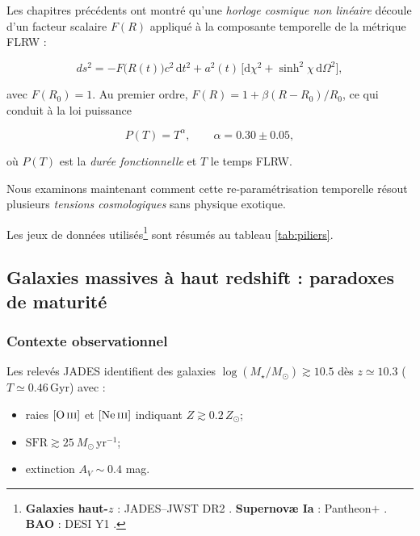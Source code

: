 \documentclass[11pt]{article}
\begin{document}
Les chapitres précédents ont montré qu’une \emph{horloge cosmique non
linéaire} découle d’un facteur scalaire \(F(R)\) appliqué à
la composante temporelle de la métrique FLRW :

\begin{equation}
\label{eq:metricRenorm}
ds^{2} = -F\!\bigl(R(t)\bigr)c^{2}\,\mathrm dt^{2}
         + a^{2}(t)\,\bigl[\mathrm d\chi^{2}
         +\sinh^{2}\!\chi\,\mathrm d\Omega^{2}\bigr],
\end{equation}

avec \(F(R_{0})=1\).  Au premier ordre,
\(F(R)=1+\beta(R-R_{0})/R_{0}\), ce qui conduit à la loi puissance

\begin{equation}
\label{eq:PTpower}
P(T)=T^{\alpha},
\qquad
\alpha = 0.30 \pm 0.05,
\end{equation}

où \(P(T)\) est la \emph{durée fonctionnelle} et \(T\) le temps FLRW.

Nous examinons maintenant comment cette re-paramétrisation temporelle
résout plusieurs \emph{tensions cosmologiques} sans physique exotique.

Les jeux de données utilisés\footnote{%
\textbf{Galaxies haut-\(z\)} : JADES–JWST DR2
\parencite{Robertson2024,Labbé2024}.  
\textbf{Supernovæ Ia} : Pantheon\(+\) \parencite{Brout2022,SH0ES2024}.  
\textbf{BAO} : DESI Y1 \parencite{DESI2023}.}
sont résumés au tableau \ref{tab:piliers}.

\subsection{Galaxies massives à haut redshift : paradoxes de maturité}

\subsubsection*{Contexte observationnel}

Les relevés \textsc{JADES} identifient des galaxies
\(\log(M_\star/M_\odot)\gtrsim10.5\) dès \(z\simeq10.3\)
(\(T\simeq0.46\,\mathrm{Gyr}\)) avec :

\begin{itemize}
  \item raies \([\mathrm{O\,\textsc{iii}}]\) et
        \([\mathrm{Ne\,\textsc{iii}}]\) indiquant
        \(Z\gtrsim0.2\,Z_\odot\);
  \item \(\mathrm{SFR}\gtrsim25~M_\odot\,\mathrm{yr^{-1}}\);
  \item extinction \(A_V\sim0.4\) mag.
\end{itemize}
\end{document}
